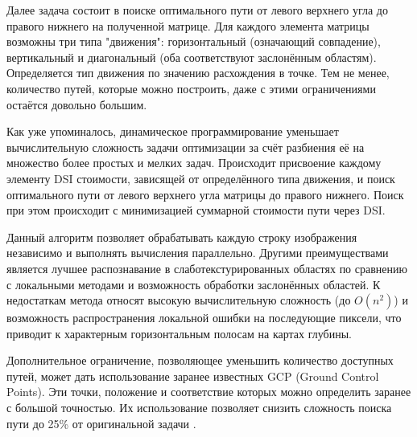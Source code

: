 Далее задача состоит в поиске оптимального пути от левого верхнего угла до правого нижнего на полученной матрице. Для каждого элемента матрицы возможны три типа "движения": горизонтальный (означающий совпадение),
 вертикальный и диагональный (оба соответствуют заслонённым областям). Определяется тип движения по значению расхождения в точке. Тем не менее, количество путей, которые можно построить, даже с этими ограничениями 
 остаётся довольно большим.

 Как уже упоминалось, динамическое программирование уменьшает вычислительную сложность задачи оптимизации   за счёт разбиения её на множество более простых и мелких задач. 
Происходит присвоение каждому элементу DSI стоимости, зависящей от определённого типа движения, и поиск оптимального пути от левого верхнего угла 
матрицы до правого нижнего. Поиск при этом происходит с минимизацией суммарной стоимости пути через DSI. 

Данный алгоритм позволяет обрабатывать каждую строку изображения независимо и выполнять вычисления параллельно. Другими преимуществами является лучшее распознавание в слаботекстурированных 
областях по сравнению с локальными методами и возможность обработки заслонённых областей.   %
К недостаткам метода относят высокую вычислительную сложность (до $O(n^2)$) и возможность распространения локальной ошибки на последующие пиксели, что приводит к характерным горизонтальным полосам на картах глубины. 

Дополнительное ограничение, позволяющее уменьшить количество доступных путей, может дать использование заранее известных GCP (Ground Control Points). Эти точки, положение и 
соответствие которых можно определить заранее с большой точностью. Их использование позволяет снизить сложность поиска пути до 25\% от оригинальной задачи \cite{DSI}. 

